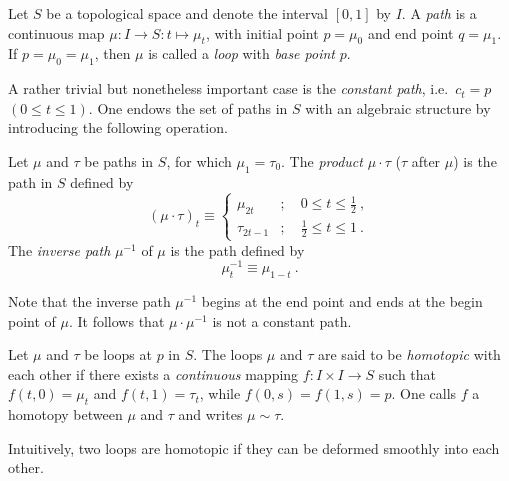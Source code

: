 \documentclass[10pt,reqno]{amsart}
\numberwithin{equation}{section}
\begin{document}
\begin{definition}
	Let $S$ be a topological space and denote the interval $[0,1]$ 
	by $I$. A \emph{path} is a continuous map $\mu : I \to S : t 
	\mapsto \mu_t$, with initial point $p = \mu_0$ and end point 
	$q = \mu_1$.
	If $p = \mu_0 = \mu_1$, then $\mu$ is called a \emph{loop} 
	with \emph{base point} $p$.
\end{definition}
A rather trivial but nonetheless important case is the 
\emph{constant path}, i.e.\ $c_t = p$ $(0 \leq t \leq 1)$. One 
endows the set of paths in $S$ with an algebraic structure by 
introducing the following operation.
%
\begin{definition}
	Let $\mu$ and $\tau$ be paths in $S$, for which $\mu_1 = 
	\tau_0$. The \emph{product} $\mu\cdot\tau$ ($\tau$ after 
	$\mu$) is the path in $S$ defined by
	\begin{equation}
		(\mu\cdot\tau)_t \equiv
		\begin{cases}
			\mu_{2t} & ;\quad 0 \leq t \leq \tfrac{1}{2}~, \\
			\tau_{2t-1} & ;\quad \frac{1}{2} \leq t \leq 1~.
		\end{cases}
	\end{equation}
	The \emph{inverse path} $\mu^{-1}$ of $\mu$ is the path 
	defined by
	\begin{equation}
		\mu^{-1}_t \equiv \mu_{1-t}~.
	\end{equation}
\end{definition}
Note that the inverse path $\mu^{-1}$ begins at the end point and 
ends at the begin point of $\mu$. It follows that 
$\mu\cdot\mu^{-1}$ is not a constant path.

\begin{definition}[Homotopy]
	Let $\mu$ and $\tau$ be loops at $p$ in $S$. The loops $\mu$ 
	and $\tau$ are said to be \emph{homotopic} with each other if 
	there exists a \emph{continuous} mapping $f : I \times I \to 
	S$ such that $f(t,0) = \mu_t$ and $f(t,1) = \tau_t$, while 
	$f(0,s) = f(1,s) = p$. One calls $f$ a homotopy between $\mu$ 
	and $\tau$ and writes $\mu \sim \tau$.
\end{definition}
Intuitively, two loops are homotopic if they can be deformed 
smoothly into each other.
\end{document}
